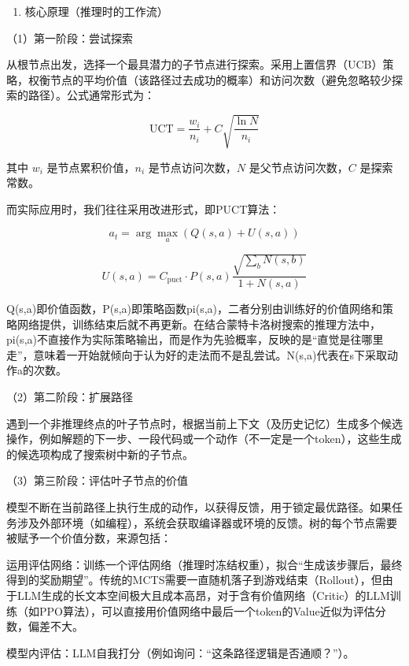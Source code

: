 \begin{enumerate}
\def\labelenumi{\arabic{enumi}.}
\tightlist
\item
  核心原理（推理时的工作流）
\end{enumerate}

（1）第一阶段：尝试探索

从根节点出发，选择一个最具潜力的子节点进行探索。采用上置信界（UCB）策略，权衡节点的平均价值（该路径过去成功的概率）和访问次数（避免忽略较少探索的路径）。公式通常形式为：

\[
\mathrm{UCT}=\frac{w_i}{n_i}+C\sqrt{\frac{\ln N}{n_i}}
\]

其中 \(w_i\) 是节点累积价值，\(n_i\) 是节点访问次数，\(N\) 是父节点访问次数，\(C\) 是探索常数。

而实际应用时，我们往往采用改进形式，即PUCT算法：

\[
a_t=\arg\max_a\left(Q(s,a)+U(s,a)\right)
\]

\[
U(s,a)=C_{\mathrm{puct}}\cdot P(s,a)\frac{\sqrt{\sum_b N(s,b)}}{1+N(s,a)}
\]

Q(s,a)即价值函数，P(s,a)即策略函数pi(s,a)，二者分别由训练好的价值网络和策略网络提供，训练结束后就不再更新。在结合蒙特卡洛树搜索的推理方法中，pi(s,a)不直接作为实际策略输出，而是作为先验概率，反映的是``直觉是往哪里走''，意味着一开始就倾向于认为好的走法而不是乱尝试。N(s,a)代表在s下采取动作a的次数。

（2）第二阶段：扩展路径

遇到一个非推理终点的叶子节点时，根据当前上下文（及历史记忆）生成多个候选操作，例如解题的下一步、一段代码或一个动作（不一定是一个token），这些生成的候选项构成了搜索树中新的子节点。

（3）第三阶段：评估叶子节点的价值

模型不断在当前路径上执行生成的动作，以获得反馈，用于锁定最优路径。如果任务涉及外部环境（如编程），系统会获取编译器或环境的反馈。树的每个节点需要被赋予一个价值分数，来源包括：

运用评估网络：训练一个评估网络（推理时冻结权重），拟合``生成该步骤后，最终得到的奖励期望''。传统的MCTS需要一直随机落子到游戏结束（Rollout），但由于LLM生成的长文本空间极大且成本高昂，对于含有价值网络（Critic）的LLM训练（如PPO算法），可以直接用价值网络中最后一个token的Value近似为评估分数，偏差不大。

模型内评估：LLM自我打分（例如询问：``这条路径逻辑是否通顺？''）。

